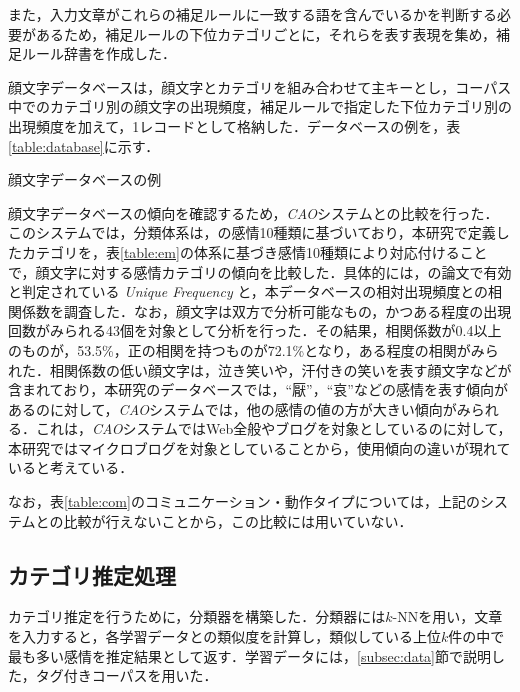 \documentclass[japanese]{jnlp_1.4}
\begin{document}
また，入力文章がこれらの補足ルールに一致する語を含んでいるかを判断する必要があるため，補足ルールの下位カテゴリごとに，それらを表す表現を集め，補足ルール辞書を作成した．

顔文字データベースは，顔文字とカテゴリを組み合わせて主キーとし，コーパス中でのカテゴリ別の顔文字の出現頻度，補足ルールで指定した下位カテゴリ別の出現頻度を加えて，1レコードとして格納した．データベースの例を，表\ref{table:database}に示す．

\newcommand{\TateMoji}[1]{}
\begin{table}[t]
\caption{顔文字データベースの例}
\label{table:database}

\end{table}

顔文字データベースの傾向を確認するため，{\it CAO}システム\cite{ptas2010b}との比較を行った．このシステムでは，分類体系は，の感情10種類に基づいており，本研究で定義したカテゴリを，表\ref{table:em}の体系に基づき感情10種類により対応付けることで，顔文字に対する感情カテゴリの傾向を比較した．具体的には，の論文で有効と判定されている {\it Unique Frequency} と，本データベースの相対出現頻度との相関係数を調査した．なお，顔文字は双方で分析可能なもの，かつある程度の出現回数がみられる43個を対象として分析を行った．その結果，相関係数が0.4以上のものが，53.5\%，正の相関を持つものが72.1\%となり，ある程度の相関がみられた．相関係数の低い顔文字は，泣き笑いや，汗付きの笑いを表す顔文字などが含まれており，本研究のデータベースでは，``厭''，``哀''などの感情を表す傾向があるのに対して，{\it CAO}システムでは，他の感情の値の方が大きい傾向がみられる．これは，{\it CAO}システムではWeb全般やブログを対象としているのに対して，本研究ではマイクロブログを対象としていることから，使用傾向の違いが現れていると考えている．

なお，表\ref{table:com}のコミュニケーション・動作タイプについては，上記のシステムとの比較が行えないことから，この比較には用いていない．


\subsection{カテゴリ推定処理}
\label{subsec:estimate}

カテゴリ推定を行うために，分類器を構築した．分類器には$k$-NNを用い，文章を入力すると，各学習データとの類似度を計算し，類似している上位$k$件の中で最も多い感情を推定結果として返す．学習データには，\ref{subsec:data}節で説明した，タグ付きコーパスを用いた．
\end{document}
